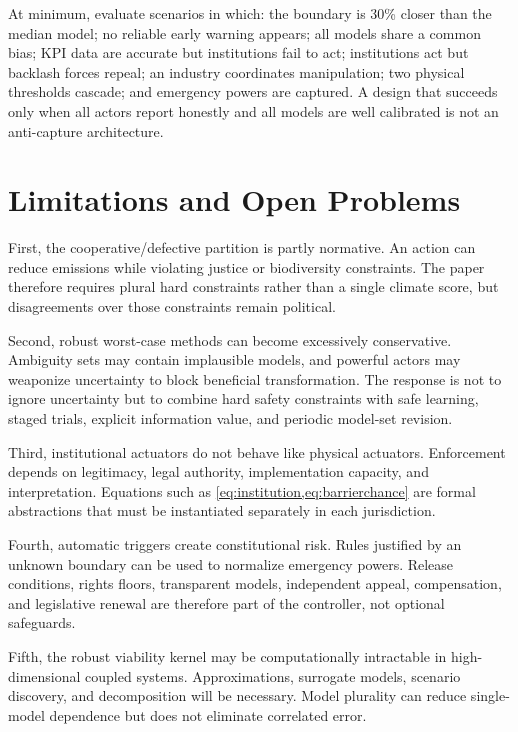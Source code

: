 \documentclass[11pt,a4paper]{article}
\numberwithin{equation}{section}
\theoremstyle{definition}
\theoremstyle{plain}
\theoremstyle{remark}
\begin{document}
At minimum, evaluate scenarios in which: the boundary is 30\% closer than the median model; no reliable early warning appears; all models share a common bias; KPI data are accurate but institutions fail to act; institutions act but backlash forces repeal; an industry coordinates manipulation; two physical thresholds cascade; and emergency powers are captured. A design that succeeds only when all actors report honestly and all models are well calibrated is not an anti-capture architecture.

\section{Limitations and Open Problems}

First, the cooperative/defective partition is partly normative. An action can reduce emissions while violating justice or biodiversity constraints. The paper therefore requires plural hard constraints rather than a single climate score, but disagreements over those constraints remain political.

Second, robust worst-case methods can become excessively conservative. Ambiguity sets may contain implausible models, and powerful actors may weaponize uncertainty to block beneficial transformation. The response is not to ignore uncertainty but to combine hard safety constraints with safe learning, staged trials, explicit information value, and periodic model-set revision.

Third, institutional actuators do not behave like physical actuators. Enforcement depends on legitimacy, legal authority, implementation capacity, and interpretation. Equations such as \cref{eq:institution,eq:barrierchance} are formal abstractions that must be instantiated separately in each jurisdiction.

Fourth, automatic triggers create constitutional risk. Rules justified by an unknown boundary can be used to normalize emergency powers. Release conditions, rights floors, transparent models, independent appeal, compensation, and legislative renewal are therefore part of the controller, not optional safeguards.

Fifth, the robust viability kernel may be computationally intractable in high-dimensional coupled systems. Approximations, surrogate models, scenario discovery, and decomposition will be necessary. Model plurality can reduce single-model dependence but does not eliminate correlated error.
\end{document}
